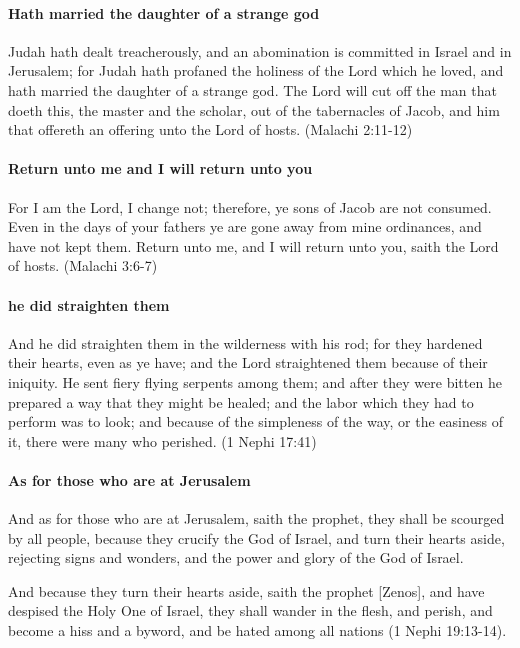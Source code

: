 \paragraph{Hath married the daughter of a strange god}
Judah hath dealt treacherously, and an abomination is committed in Israel and in Jerusalem; for Judah hath profaned the holiness of the Lord which he loved, and hath married the daughter of a strange god. The Lord will cut off the man that doeth this, the master and the scholar, out of the tabernacles of Jacob, and him that offereth an offering unto the Lord of hosts. (Malachi 2:11-12)

\paragraph{Return unto me and I will return unto you}
For I am the Lord, I change not; therefore, ye sons of Jacob are not consumed. Even in the days of your fathers ye are gone away from mine ordinances, and have not kept them. Return unto me, and I will return unto you, saith the Lord of hosts. (Malachi 3:6-7)

\paragraph{he did straighten them}
And he did straighten them in the wilderness with his rod; for they hardened their hearts, even as ye have; and the Lord straightened them because of their iniquity. He sent fiery flying serpents among them; and after they were bitten he prepared a way that they might be healed; and the labor which they had to perform was to look; and because of the simpleness of the way, or the easiness of it, there were many who perished. (1 Nephi 17:41)

\paragraph{As for those who are at Jerusalem}
And as for those who are at Jerusalem, saith the prophet, they shall be scourged by all people, because they crucify the God of Israel, and turn their hearts aside, rejecting signs and wonders, and the power and glory of the God of Israel.

And because they turn their hearts aside, saith the prophet [Zenos], and have despised the Holy One of Israel, they shall wander in the flesh, and perish, and become a hiss and a byword, and be hated among all nations (1 Nephi 19:13-14).

